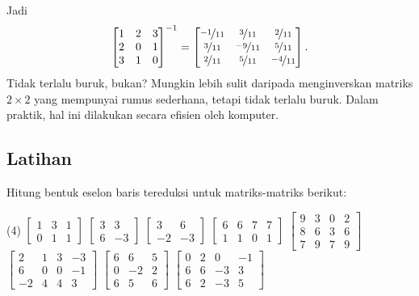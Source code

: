 Jadi
\begin{equation*}
{\begin{bmatrix}
1 & 2 & 3 \\
2 & 0 & 1 \\
3 & 1 & 0
\end{bmatrix}}^{-1}
=
\begin{bmatrix}
\nicefrac{-1}{11} & \nicefrac{3}{11} & \nicefrac{2}{11} \\
\nicefrac{3}{11} & \nicefrac{-9}{11} & \nicefrac{5}{11} \\
\nicefrac{2}{11} & \nicefrac{5}{11} & \nicefrac{-4}{11}
\end{bmatrix} .
\end{equation*}
Tidak terlalu buruk, bukan? Mungkin lebih sulit daripada menginverskan matriks $2 \times 2$
yang mempunyai rumus sederhana, tetapi tidak terlalu buruk. Dalam praktik, hal ini
dilakukan secara efisien oleh komputer.

\subsection{Latihan}

\begin{samepage}
\begin{exercise}
Hitung bentuk eselon baris tereduksi untuk matriks-matriks berikut:
\begin{tasks}(4)
\task
$\begin{bmatrix}
1 & 3 & 1 \\
0 & 1 & 1
\end{bmatrix}$
\task
$\begin{bmatrix}
3 & 3 \\
6 & -3
\end{bmatrix}$
\task
$\begin{bmatrix}
3 & 6 \\
-2 & -3
\end{bmatrix}$
\task
$\begin{bmatrix}
6 & 6 & 7 & 7 \\
1 & 1 & 0 & 1
\end{bmatrix}$
\task
$\begin{bmatrix}
9 & 3 & 0 & 2 \\
8 & 6 & 3 & 6 \\
7 & 9 & 7 & 9
\end{bmatrix}$
\task
$\begin{bmatrix}
2 & 1 & 3 & -3 \\
6 & 0 & 0 & -1 \\
-2 & 4 & 4 & 3
\end{bmatrix}$
\task
$\begin{bmatrix}
6 & 6 & 5 \\
0 & -2 & 2 \\
6 & 5 & 6
\end{bmatrix}$
\task
$\begin{bmatrix}
0 & 2 & 0 & -1 \\
6 & 6 & -3 & 3 \\
6 & 2 & -3 & 5
\end{bmatrix}$
\end{tasks}
\end{exercise}
\end{samepage}

